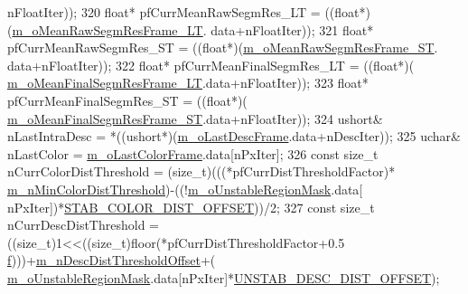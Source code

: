 \begin{DoxyCode}
      nFloatIter));
320             \textcolor{keywordtype}{float}* pfCurrMeanRawSegmRes\_LT = ((\textcolor{keywordtype}{float}*)(\mbox{\hyperlink{class_background_subtractor_su_b_s_e_n_s_e_a7706b13433c4e9f4f8156e075fa7904d}{m\_oMeanRawSegmResFrame\_LT}}.
      data+nFloatIter));
321             \textcolor{keywordtype}{float}* pfCurrMeanRawSegmRes\_ST = ((\textcolor{keywordtype}{float}*)(\mbox{\hyperlink{class_background_subtractor_su_b_s_e_n_s_e_a3c9fd9cf995eb9a7b4006467ab874958}{m\_oMeanRawSegmResFrame\_ST}}.
      data+nFloatIter));
322             \textcolor{keywordtype}{float}* pfCurrMeanFinalSegmRes\_LT = ((\textcolor{keywordtype}{float}*)(
      \mbox{\hyperlink{class_background_subtractor_su_b_s_e_n_s_e_ad48e92b6d6bbce34f9f452484bc9956a}{m\_oMeanFinalSegmResFrame\_LT}}.data+nFloatIter));
323             \textcolor{keywordtype}{float}* pfCurrMeanFinalSegmRes\_ST = ((\textcolor{keywordtype}{float}*)(
      \mbox{\hyperlink{class_background_subtractor_su_b_s_e_n_s_e_a0dcd4f5df8adb9b4fa630a9a6f6b5e30}{m\_oMeanFinalSegmResFrame\_ST}}.data+nFloatIter));
324             ushort& nLastIntraDesc = *((ushort*)(\mbox{\hyperlink{class_background_subtractor_l_b_s_p_a9c637c0b87cac495887295690d83ba13}{m\_oLastDescFrame}}.data+nDescIter));
325             uchar& nLastColor = \mbox{\hyperlink{class_background_subtractor_l_b_s_p_ab1dc003792ab1d0b881a6fd10e0e29b3}{m\_oLastColorFrame}}.data[nPxIter];
326             \textcolor{keyword}{const} \textcolor{keywordtype}{size\_t} nCurrColorDistThreshold = (size\_t)(((*pfCurrDistThresholdFactor)*
      \mbox{\hyperlink{class_background_subtractor_su_b_s_e_n_s_e_ae0ebf701652a66bbdb0472d6f091e34d}{m\_nMinColorDistThreshold}})-((!\mbox{\hyperlink{class_background_subtractor_su_b_s_e_n_s_e_acfaf4c3c5aedbed8bd302444b4a4f8dd}{m\_oUnstableRegionMask}}.data[
      nPxIter])*\mbox{\hyperlink{_background_subtractor_su_b_s_e_n_s_e_8cpp_af60b797fbe4d762be8f140d56f6d8a0a}{STAB\_COLOR\_DIST\_OFFSET}}))/2;
327             \textcolor{keyword}{const} \textcolor{keywordtype}{size\_t} nCurrDescDistThreshold = ((size\_t)1<<((\textcolor{keywordtype}{size\_t})floor(*pfCurrDistThresholdFactor+0.5
      \mbox{\hyperlink{rings_8cpp_a77369fc4d5326a16d2c603e032023528}{f}})))+\mbox{\hyperlink{class_background_subtractor_su_b_s_e_n_s_e_a79fe0f1657cd613b975d62f73e749ec2}{m\_nDescDistThresholdOffset}}+(
      \mbox{\hyperlink{class_background_subtractor_su_b_s_e_n_s_e_acfaf4c3c5aedbed8bd302444b4a4f8dd}{m\_oUnstableRegionMask}}.data[nPxIter]*\mbox{\hyperlink{_background_subtractor_su_b_s_e_n_s_e_8cpp_af189e5399183f3cfa1dee820fb2fa8fc}{UNSTAB\_DESC\_DIST\_OFFSET}});

\end{DoxyCode}
